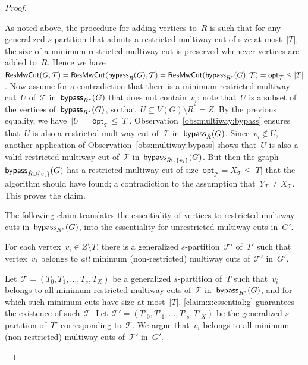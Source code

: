 \begin{proof}
\begin{claimproof}
As noted above, the procedure for adding vertices to~$R$ is such that for any generalized $s$-partition that admits a restricted multiway cut of size at most~$|T|$, the size of a minimum restricted multiway cut is preserved whenever vertices are added to~$R$. Hence we have~$\mathsf{ResMwCut}(G, \mathcal{T}) = \mathsf{ResMwCut}(\mathsf{bypass}_{\hat{R}}(G), \mathcal{T}) = \mathsf{ResMwCut}(\mathsf{bypass}_{R^*}(G), \mathcal{T}) = \mathsf{opt}_{\mathcal{T}} \leq |T|$. Now assume for a contradiction that there is a minimum restricted multiway cut~$U$ of~$\mathcal{T}$ in~$\mathsf{bypass}_{R^*}(G)$ that does not contain~$v_i$; note that~$U$ is a subset of the vertices of~$\mathsf{bypass}_{R^*}(G)$, so that~$U \subseteq V(G) \setminus R^* = Z$. By the previous equality, we have~$|U| = \mathsf{opt}_{\mathcal{T}} \leq |T|$. Observation~\ref{obs:multiway:bypass} ensures that~$U$ is also a restricted multiway cut of~$\mathcal{T}$ in~$\mathsf{bypass}_{\hat{R}}(G)$. Since~$v_i \notin U$, another application of Observation~\ref{obs:multiway:bypass} shows that~$U$ is also a valid restricted multiway cut of~$\mathcal{T}$ in~$\mathsf{bypass}_{\hat{R} \cup \{v_i\}}(G)$. But then the graph~$\mathsf{bypass}_{\hat{R} \cup \{v_i\}}(G)$ has a restricted multiway cut of size~$\mathsf{opt}_{\mathcal{T}} = X_{\mathcal{T}} \leq |T|$ that the algorithm should have found; a contradiction to the assumption that~$Y_{\mathcal{T}} \neq X_{\mathcal{T}}$. This proves the claim.
\end{claimproof}

The following claim translates the essentiality of vertices to restricted multiway cuts in~$\mathsf{bypass}_{R^*}(G)$, into the essentiality for unrestricted multiway cuts in~$G'$.

\begin{claim} \label{claim:z:essential:gprime}
For each vertex~$v_i \in Z \setminus T$, there is a generalized $s$-partition~$\mathcal{T}'$ of~$T'$ such that vertex~$v_i$ belongs to \emph{all} minimum (non-restricted) multiway cuts of~$\mathcal{T}'$ in~$G'$.
\end{claim}
\begin{claimproof}
Let~$\mathcal{T} = (T_0, T_1, \ldots, T_s, T_X)$ be a generalized $s$-partition of~$T$ such that~$v_i$ belongs to all minimum restricted multiway cuts of~$\mathcal{T}$ in~$\mathsf{bypass}_{R^*}(G)$, and for which such minimum cuts have size at most~$|T|$. \cref{claim:z:essential:g} guarantees the existence of such~$\mathcal{T}$. Let~$\mathcal{T}' = (T'_0, T'_1, \ldots, T'_s, T'_X)$ be the generalized $s$-partition of~$T'$ corresponding to~$\mathcal{T}$. We argue that~$v_i$ belongs to all minimum (non-restricted) multiway cuts of~$\mathcal{T}'$ in~$G'$. 


\end{claimproof}
\end{proof}
